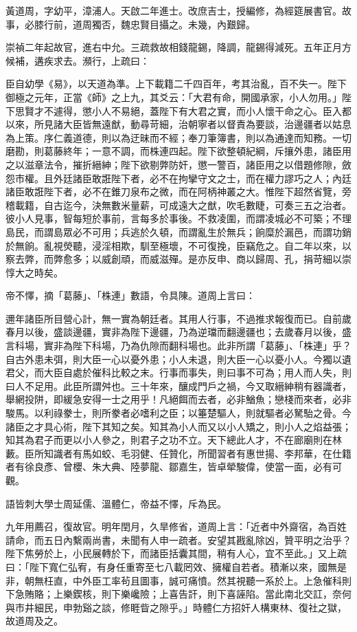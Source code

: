 \begin{pinyinscope}
黃道周，字幼平，漳浦人。天啟二年進士。改庶吉士，授編修，為經筵展書官。故事，必膝行前，道周獨否，魏忠賢目攝之。未幾，內艱歸。

崇禎二年起故官，進右中允。三疏救故相錢龍錫，降調，龍錫得減死。五年正月方候補，遘疾求去。瀕行，上疏曰：

臣自幼學《易》，以天道為準。上下載籍二千四百年，考其治亂，百不失一。陛下御極之元年，正當《師》之上九，其爻云：「大君有命，開國承家，小人勿用。」陛下思賢才不遽得，懲小人不易絕，蓋陛下有大君之實，而小人懷干命之心。臣入都以來，所見諸大臣皆無遠猷，動尋苛細，治朝寧者以督責為要談，治邊疆者以姑息為上策。序仁義道德，則以為迂昧而不經；奉刀筆簿書，則以為通達而知務。一切磨勘，則葛藤終年；一意不調，而株連四起。陛下欲整頓紀綱，斥攘外患，諸臣用之以滋章法令，摧折縉紳；陛下欲剔弊防奸，懲一警百，諸臣用之以借題修隙，斂怨市權。且外廷諸臣敢誑陛下者，必不在拘攣守文之士，而在權力謬巧之人；內廷諸臣敢誑陛下者，必不在錐刀泉布之微，而在阿柄神叢之大。惟陛下超然省覽，旁稽載籍，自古迄今，決無數米量薪，可成遠大之猷，吹毛數睫，可奏三五之治者。彼小人見事，智每短於事前，言每多於事後。不救凌圍，而謂凌城必不可築；不理島民，而謂島眾必不可用；兵逃於久頓，而謂亂生於無兵；餉糜於漏邑，而謂功銷於無餉。亂視熒聽，浸淫相欺，馴至極壞，不可復挽，臣竊危之。自二年以來，以察去弊，而弊愈多；以威創頑，而威滋殫。是亦反申、商以歸周、孔，捐苛細以崇惇大之時矣。

帝不懌，摘「葛藤」、「株連」數語，令具陳。道周上言曰：

邇年諸臣所目營心計，無一實為朝廷者。其用人行事，不過推求報復而已。自前歲春月以後，盛談邊疆，實非為陛下邊疆，乃為逆璫而翻邊疆也；去歲春月以後，盛言科場，實非為陛下科場，乃為仇隙而翻科場也。此非所謂「葛藤」、「株連」乎？自古外患未弭，則大臣一心以憂外患；小人未退，則大臣一心以憂小人。今獨以遺君父，而大臣自處於催科比較之末。行事而事失，則曰事不可為；用人而人失，則曰人不足用。此臣所謂舛也。三十年來，釀成門戶之禍，今又取縉紳稍有器識者，舉網投阱，即緩急安得一士之用乎！凡絕餌而去者，必非鰌魚；戀棧而來者，必非駿馬。以利祿豢士，則所豢者必嗜利之臣；以箠楚驅人，則就驅者必駑駘之骨。今諸臣之才具心術，陛下其知之矣。知其為小人而又以小人矯之，則小人之焰益張；知其為君子而更以小人參之，則君子之功不立。天下總此人才，不在廊廟則在林藪。臣所知識者有馬如蛟、毛羽健、任贊化，所聞習者有惠世揚、李邦華，在仕籍者有徐良彥、曾櫻、朱大典、陸夢龍、鄒嘉生，皆卓犖駿偉，使當一面，必有可觀。

語皆刺大學士周延儒、溫體仁，帝益不懌，斥為民。

九年用薦召，復故官。明年閏月，久旱修省，道周上言：「近者中外齋宿，為百姓請命，而五日內繫兩尚書，未聞有人申一疏者。安望其戡亂除凶，贊平明之治乎？陛下焦勞於上，小民展轉於下，而諸臣括囊其間，稍有人心，宜不至此。」又上疏曰：「陛下寬仁弘宥，有身任重寄至七八載罔效、擁權自若者。積漸以來，國無是非，朝無枉直，中外臣工率茍且圖事，誠可痛憤。然其視聽一系於上。上急催科則下急賄賂；上樂鍥核，則下樂巉險；上喜告訐，則下喜誣陷。當此南北交訌，奈何與市井細民，申勃谿之談，修睚眥之隙乎。」時體仁方招奸人構東林、復社之獄，故道周及之。


\end{pinyinscope}
